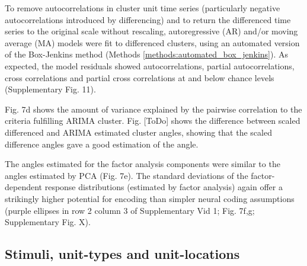 \documentclass{article}
\begin{document}
To remove autocorrelations in cluster unit time series (particularly negative autocorrelations introduced by differencing) and to return the differenced time series to the original scale without rescaling, autoregressive (AR) and/or moving average (MA) models were fit to differenced clusters, using an automated version of the Box-Jenkins method (Methods \ref{methods:automated_box_jenkins}).
As expected, the model residuals showed autocorrelations, partial autocorrelations, cross correlations and partial cross correlations at and below chance levels (Supplementary Fig. 11). 


Fig. 7d shows the amount of variance explained by the pairwise correlation to the criteria fulfilling ARIMA cluster.
Fig. [ToDo] shows the difference between scaled differenced and ARIMA estimated cluster angles, showing that the scaled difference angles gave a good estimation of the angle.

The angles estimated for the factor analysis components were similar to the angles estimated by PCA (Fig. 7e). The standard deviations of the factor-dependent response distributions (estimated by factor analysis) again offer a strikingly higher potential for encoding than simpler neural coding assumptions (purple ellipses in row 2 column 3 of Supplementary Vid 1; Fig. 7f,g; Supplementary Fig. X).



\subsection*{Stimuli, unit-types and unit-locations}
\end{document}
